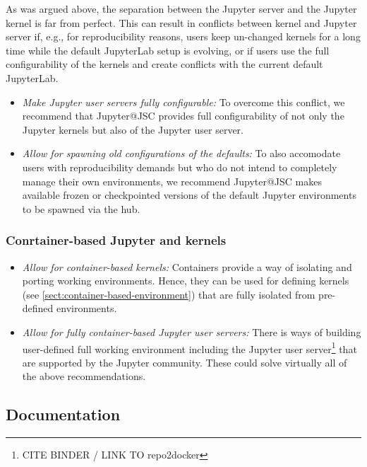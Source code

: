 As was argued above, the separation between the Jupyter server and the Jupyter kernel is far from perfect.
This can result in conflicts between kernel and Jupyter server if, e.g., for reproducibility reasons, users keep un-changed kernels for a long time while the default JupyterLab setup is evolving, or if users use the full configurability of the kernels and create conflicts with the current default JupyterLab.

\begin{itemize}
  \item \emph{Make Jupyter user servers fully configurable:} To overcome this conflict, we recommend that Jupyter@JSC provides full configurability of not only the Jupyter kernels but also of the Jupyter user server.
  \item \emph{Allow for spawning old configurations of the defaults:} To also accomodate users with reproducibility demands but who do not intend to completely manage their own environments, we recommend Jupyter@JSC makes available frozen or checkpointed versions of the default Jupyter environments to be spawned via the hub.
\end{itemize}

\subsubsection{Conrtainer-based Jupyter and kernels}

\begin{itemize}
  \item \emph{Allow for container-based kernels:} Containers provide a way of isolating and porting working environments.
  Hence, they can be used for defining kernels (see \ref{sect:container-based-environment}) that are fully isolated from pre-defined environments.
  \item \emph{Allow for fully container-based Jupyter user servers:} There is ways of building user-defined full working environment including the Jupyter user server\footnote{CITE BINDER / LINK TO repo2docker} that are supported by the Jupyter community.
  These could solve virtually all of the above recommendations.
\end{itemize}

\subsection{Documentation}

